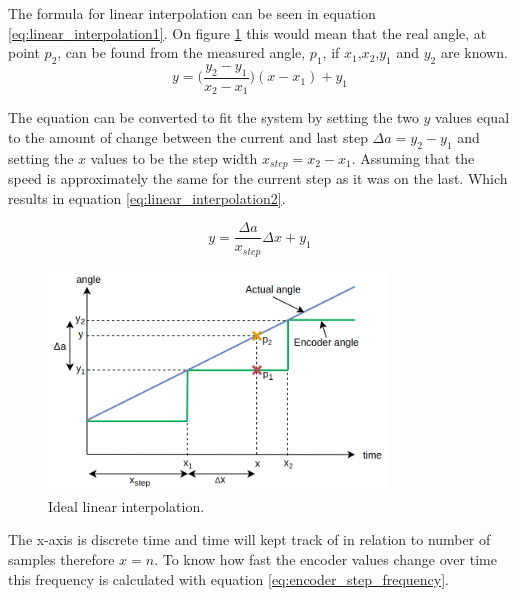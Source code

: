 
The formula for linear interpolation can be seen in equation \ref{eq:linear_interpolation1}. On figure \ref{fig:angle_interpolation1} this would mean that the real angle, at point $p_2$, can be found from the measured angle, $p_1$, if $x_1$,$x_2$,$y_1$ and $y_2$ are known.
\begin{equation}
    y = \Big( \frac{y_2-y_1}{x_2-x_1} \Big)(x-x_1)+y_1
    \label{eq:linear_interpolation1}
\end{equation}

The equation can be converted to fit the system by setting the two $y$ values equal to the amount of change between the current and last step $\Delta a = y_2 - y_1$ and setting the $x$ values to be the step width $x_{step} = x_2 - x_1$. Assuming that the speed is approximately the same for the current step as it was on the last. Which results in equation \ref{eq:linear_interpolation2}.



\begin{equation}
    y =  \frac{\Delta a}{x_{step}} \Delta x+y_1
    \label{eq:linear_interpolation2}
\end{equation}

\begin{figure}[H]
	\centering
	\includegraphics[width=0.8\textwidth]{pictures/software/angle_interpolation1.png}
	\caption{Ideal linear interpolation.}
	\label{fig:angle_interpolation1}
\end{figure}

The x-axis is discrete time and time will kept track of in relation to number of samples therefore $x = n$. To know how fast the encoder values change over time this frequency is calculated with equation \ref{eq:encoder_step_frequency}.

